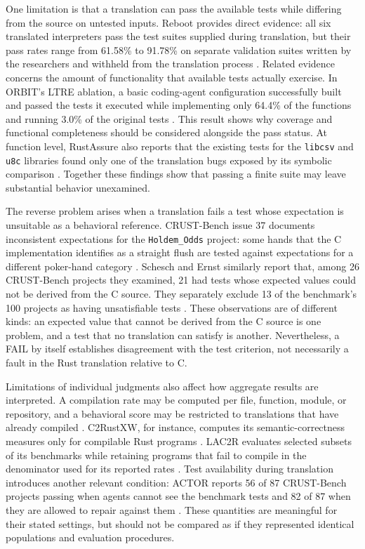 One limitation is that a translation can pass the available tests while
differing from the source on untested inputs. Reboot provides direct
evidence: all six translated interpreters pass the test suites supplied
during translation, but their pass rates range from 61.58\% to 91.78\%
on separate validation suites written by the researchers and withheld
from the translation process \cite{wang2026reboot}. Related evidence
concerns the amount of functionality that available tests actually
exercise. In ORBIT's LTRE ablation, a basic coding-agent configuration
successfully built and passed the tests it executed while implementing
only 64.4\% of the functions and running 3.0\% of the original tests
\cite{farrukh2026orbit}. This result shows why coverage and functional completeness should be considered alongside the pass status. At function level, RustAssure also reports that the
existing tests for the \texttt{libcsv} and \texttt{u8c} libraries found
only one of the translation bugs exposed by its symbolic comparison
\cite{bai2025rustassure}. Together these findings show that passing a
finite suite may leave substantial behavior unexamined.

The reverse problem arises when a translation fails a test whose
expectation is unsuitable as a behavioral reference. CRUST-Bench issue
37 documents inconsistent expectations for the \texttt{Holdem\_Odds}
project: some hands that the C implementation identifies as a straight
flush are tested against expectations for a different poker-hand
category \cite{crustbench-issues}. Schesch and Ernst similarly report
that, among 26 CRUST-Bench projects they examined, 21 had tests whose expected values could not be derived from the C source. They separately exclude 13 of the benchmark's 100 projects as having unsatisfiable tests
\cite{schesch2026actor}. These observations are of different kinds: an expected value that cannot be derived from the C source is one problem, and a test that no translation can satisfy is another. Nevertheless, a FAIL by itself
establishes disagreement with the test criterion, not necessarily a
fault in the Rust translation relative to C.

Limitations of individual judgments also affect how aggregate results
are interpreted. A compilation rate may be computed per file, function,
module, or repository, and a behavioral score may be restricted to
translations that have already compiled
\cite{rustify2026,sim2026encrust,wang2026trail,wang2026evoc2rust}.
C2RustXW, for instance, computes its semantic-correctness measures only
for compilable Rust programs \cite{yan2026c2rustxw}. LAC2R evaluates
selected subsets of its benchmarks while retaining programs that fail to
compile in the denominator used for its reported rates
\cite{sim2025lac2r}. Test availability during translation introduces
another relevant condition: ACTOR reports 56 of 87 CRUST-Bench projects
passing when agents cannot see the benchmark tests and 82 of 87 when
they are allowed to repair against them \cite{schesch2026actor}. These
quantities are meaningful for their stated settings, but should not be
compared as if they represented identical populations and evaluation
procedures.


